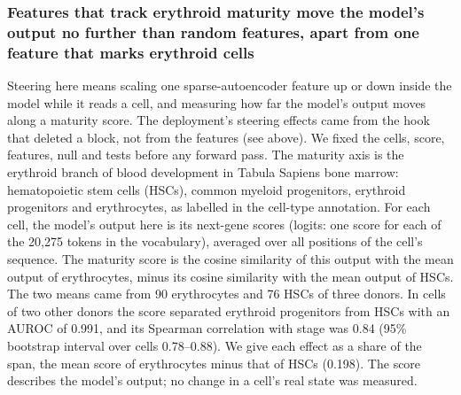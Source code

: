 \documentclass[10pt,letterpaper]{article}
\begin{document}
\subsubsection*{Features that track erythroid maturity move the model's output no further than random features, apart from one feature that marks erythroid cells}
Steering here means scaling one sparse-autoencoder feature up or down
inside the model while it reads a cell, and measuring how far the model's
output moves along a maturity score. The deployment's steering effects
came from the hook that deleted a block, not from the features (see
above). We fixed the cells, score, features, null and tests before any
forward pass. The maturity axis is the erythroid branch of blood
development in Tabula Sapiens bone marrow: hematopoietic stem cells
(HSCs), common myeloid progenitors, erythroid progenitors and
erythrocytes, as labelled in the cell-type annotation. For each cell,
the model's output here is its next-gene scores (logits: one score for
each of the 20,275 tokens in the vocabulary), averaged over all
positions of the cell's sequence. The maturity score is the cosine
similarity of this output with the mean output of erythrocytes, minus
its cosine similarity with the mean output of HSCs. The two means came
from 90 erythrocytes and 76 HSCs of three donors. In cells of two other
donors the score separated erythroid progenitors from HSCs with an AUROC
of 0.991, and its Spearman correlation with stage was 0.84 (95\% bootstrap interval over
cells 0.78--0.88). We give each effect as a share of the span, the mean
score of erythrocytes minus that of HSCs (0.198). The score describes the
model's output; no change in a cell's real state was measured.
\end{document}
